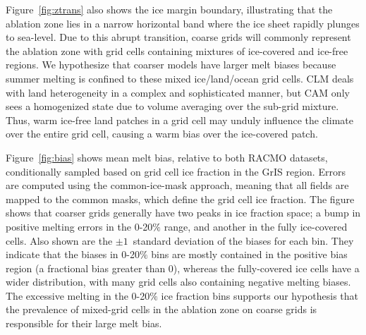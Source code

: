 \documentclass[draft]{agujournal2019}
\begin{document}
Figure~\ref{fig:ztrans} also shows the ice margin boundary, illustrating that the ablation zone lies in a narrow horizontal band where the ice sheet rapidly plunges to sea-level. Due to this abrupt transition, coarse grids will commonly represent the ablation zone with grid cells containing mixtures of ice-covered and ice-free regions. We hypothesize that coarser models have larger melt biases
because summer melting is confined to these mixed ice/land/ocean grid cells. CLM deals with land heterogeneity in a complex and sophisticated manner, but CAM only sees a homogenized state due to volume averaging over the sub-grid mixture. Thus, warm ice-free land patches in a grid cell may unduly influence the climate over the entire grid cell, causing a warm bias over the ice-covered patch.

Figure~\ref{fig:bias} shows mean melt bias, relative to both RACMO datasets, conditionally sampled based on grid cell ice fraction in the GrIS region. Errors are computed using the common-ice-mask approach, meaning that all fields are mapped to the common masks, which define the grid cell ice fraction. The figure shows that coarser grids generally have two peaks in ice fraction space; a bump in positive melting errors in the 0-20$\%$ range, and another in the fully ice-covered cells. Also shown are the $\pm 1$~standard deviation of the biases for each bin. They indicate that the biases in 0-20$\%$ bins are mostly contained in the positive bias region (a fractional bias greater than 0), whereas the fully-covered ice cells have a wider distribution, with many grid cells also containing negative melting biases. The excessive melting in the 0-20$\%$ ice fraction bins supports our hypothesis that the prevalence of mixed-grid cells in the ablation zone on coarse grids is responsible for their large melt bias.
\end{document}
